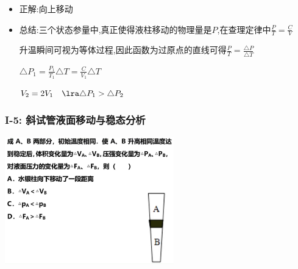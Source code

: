 \documentclass{article}
\begin{document}
\begin{itemize}
    \item 正解:\quad 向上移动
    \item 总结:\quad 三个状态参量中,真正使得液柱移动的物理量是$P$,在查理定律中$\frac{P}{T} = \frac{C}{V}$

          \hspace{3.3em}升温瞬间可视为等体过程,因此函数为过原点的直线可得$\frac{P}{T} = \frac{\triangle P}{\triangle T}$

          \hspace{3.3em}$ \triangle P_{1} = \frac{P_{1}}{T_{1}} \triangle T = \frac{C}{V_{1}} \triangle T $

          \hspace{3.3em}$ V_{2} = 2 V_{1}  \quad \lra \triangle P_{1} > \triangle P_{2}$
\end{itemize}

\vspace{2em}

\subsubsection{I-5: 斜试管液面移动与稳态分析}
\includegraphics[width = 0.55\textwidth,keepaspectratio]{./pictures/2.3-6.png}
\end{document}
